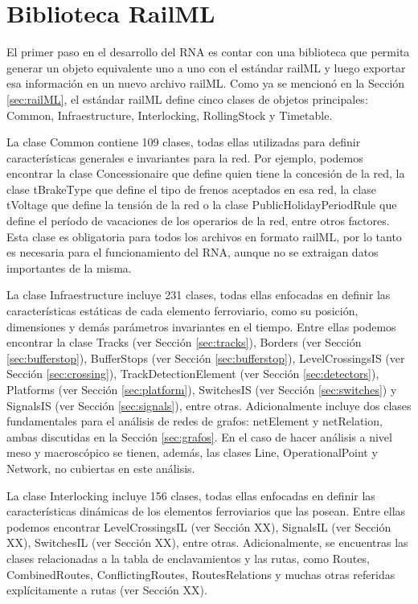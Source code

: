 \section{Biblioteca RailML}
	\label{sec:Biblioteca}
	
    El primer paso en el desarrollo del RNA es contar con una biblioteca que permita generar un objeto equivalente uno a uno con el estándar railML y luego exportar esa información en un nuevo archivo railML. Como ya se mencionó en la Sección \ref{sec:railML}, el estándar railML define cinco clases de objetos principales: Common, Infraestructure, Interlocking, RollingStock y Timetable. 

    La clase Common contiene 109 clases, todas ellas utilizadas para definir características generales e invariantes para la red. Por ejemplo, podemos encontrar la clase Concessionaire que define quien tiene la concesión de la red, la clase tBrakeType que define el tipo de frenos aceptados en esa red, la clase tVoltage que define la tensión de la red o la clase PublicHolidayPeriodRule que define el período de vacaciones de los operarios de la red, entre otros factores. Esta clase es obligatoria para todos los archivos en formato railML, por lo tanto es necesaria para el funcionamiento del RNA, aunque no se extraigan datos importantes de la misma.

    La clase Infraestructure incluye  231 clases, todas ellas enfocadas en definir las características estáticas de cada elemento ferroviario, como su posición, dimensiones y demás parámetros invariantes en el tiempo. Entre ellas podemos encontrar la clase Tracks (ver Sección \ref{sec:tracks}), Borders (ver Sección \ref{sec:bufferstop}), BufferStops (ver Sección \ref{sec:bufferstop}), LevelCrossingsIS (ver Sección \ref{sec:crossing}), TrackDetectionElement (ver Sección \ref{sec:detectors}), Platforms (ver Sección \ref{sec:platform}), SwitchesIS (ver Sección \ref{sec:switches}) y SignalsIS (ver Sección \ref{sec:signals}), entre otras. Adicionalmente incluye dos clases fundamentales para el análisis de redes de grafos: netElement y netRelation, ambas discutidas en la Sección \ref{sec:grafos}. En el caso de hacer análisis a nivel meso y macroscópico se tienen, además, las clases Line, OperationalPoint y Network, no cubiertas en este análisis.

	
    La clase Interlocking incluye 156 clases, todas ellas enfocadas en definir las características dinámicas de los elementos ferroviarios que las posean. Entre ellas podemos encontrar LevelCrossingsIL (ver Sección XX), SignalsIL (ver Sección XX), SwitchesIL (ver Sección XX), entre otras. Adicionalmente, se encuentras las clases relacionadas a la tabla de enclavamientos y las rutas, como Routes, CombinedRoutes, ConflictingRoutes, RoutesRelations y muchas otras referidas explícitamente a rutas (ver Sección XX). 
    
